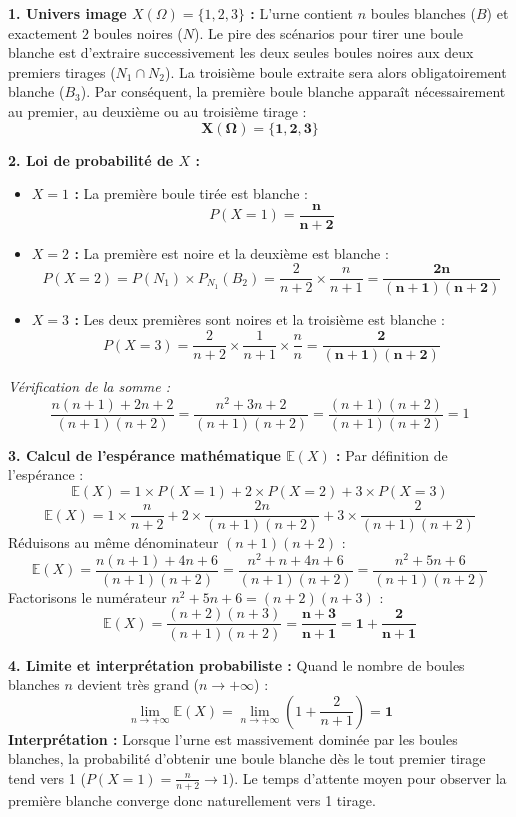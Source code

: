 \documentclass[11pt,a4paper]{article}
\newcommand{\E}{\mathbb{E}}
\begin{document}
\begin{correctionbox}
\textbf{1. Univers image $X(\Omega) = \{1, 2, 3\}$ :}
L'urne contient $n$ boules blanches ($B$) et exactement $2$ boules noires ($N$).
Le pire des scénarios pour tirer une boule blanche est d'extraire successivement les deux seules boules noires aux deux premiers tirages ($N_1 \cap N_2$). La troisième boule extraite sera alors obligatoirement blanche ($B_3$).
Par conséquent, la première boule blanche apparaît nécessairement au premier, au deuxième ou au troisième tirage :
\[
\mathbf{X(\Omega) = \{1, 2, 3\}}
\]

\textbf{2. Loi de probabilité de $X$ :}
\begin{itemize}[label=$\bullet$]
    \item \textbf{$X = 1$ :} La première boule tirée est blanche :
    \[
    P(X = 1) = \mathbf{\frac{n}{n + 2}}
    \]
    \item \textbf{$X = 2$ :} La première est noire et la deuxième est blanche :
    \[
    P(X = 2) = P(N_1) \times P_{N_1}(B_2) = \frac{2}{n + 2} \times \frac{n}{n + 1} = \mathbf{\frac{2n}{(n + 1)(n + 2)}}
    \]
    \item \textbf{$X = 3$ :} Les deux premières sont noires et la troisième est blanche :
    \[
    P(X = 3) = \frac{2}{n + 2} \times \frac{1}{n + 1} \times \frac{n}{n} = \mathbf{\frac{2}{(n + 1)(n + 2)}}
    \]
\end{itemize}
\emph{Vérification de la somme :}
\[
\frac{n(n + 1) + 2n + 2}{(n + 1)(n + 2)} = \frac{n^2 + 3n + 2}{(n + 1)(n + 2)} = \frac{(n + 1)(n + 2)}{(n + 1)(n + 2)} = 1
\]

\textbf{3. Calcul de l'espérance mathématique $\E(X)$ :}
Par définition de l'espérance :
\[
\E(X) = 1 \times P(X = 1) + 2 \times P(X = 2) + 3 \times P(X = 3)
\]
\[
\E(X) = 1 \times \frac{n}{n + 2} + 2 \times \frac{2n}{(n + 1)(n + 2)} + 3 \times \frac{2}{(n + 1)(n + 2)}
\]
Réduisons au même dénominateur $(n + 1)(n + 2)$ :
\[
\E(X) = \frac{n(n + 1) + 4n + 6}{(n + 1)(n + 2)} = \frac{n^2 + n + 4n + 6}{(n + 1)(n + 2)} = \frac{n^2 + 5n + 6}{(n + 1)(n + 2)}
\]
Factorisons le numérateur $n^2 + 5n + 6 = (n + 2)(n + 3)$ :
\[
\E(X) = \frac{(n + 2)(n + 3)}{(n + 1)(n + 2)} = \mathbf{\frac{n + 3}{n + 1}} = \mathbf{1 + \frac{2}{n + 1}}
\]

\textbf{4. Limite et interprétation probabiliste :}
Quand le nombre de boules blanches $n$ devient très grand ($n \to +\infty$) :
\[
\lim_{n \to +\infty} \E(X) = \lim_{n \to +\infty} \left( 1 + \frac{2}{n + 1} \right) = \mathbf{1}
\]
\textbf{Interprétation :} Lorsque l'urne est massivement dominée par les boules blanches, la probabilité d'obtenir une boule blanche dès le tout premier tirage tend vers 1 ($P(X=1) = \frac{n}{n+2} \to 1$). Le temps d'attente moyen pour observer la première blanche converge donc naturellement vers 1 tirage.
\end{correctionbox}
\end{document}
